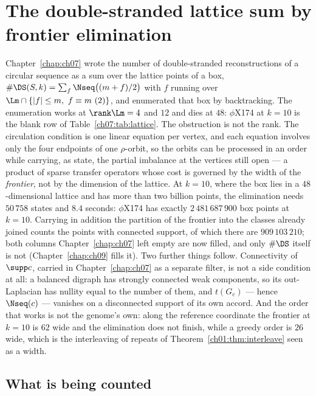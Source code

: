 \chapter[Frontier elimination]{The double-stranded lattice sum by frontier elimination}\label{chap:ch08}
\begin{chaptersummary}
Chapter~\ref{chap:ch07} wrote the number of double-stranded reconstructions of a circular sequence as a sum over
the lattice points of a box, $\#\DS(S,k)=\sum_f\Nseq\big((m+f)/2\big)$ with $f$ running over
$\Lm\cap\{|f|\le m,\ f\equiv m\ (2)\}$, and enumerated that box by backtracking. The
enumeration works at $\rank\Lm=4$ and $12$ and dies at $48$: $\phi$X174 at $k=10$ is the blank
row of Table~\ref{ch07:tab:lattice}. The obstruction is not the rank. The circulation condition is one
linear equation per vertex, and each equation involves only the four endpoints of one
$\rho$-orbit, so the orbits can be processed in an order while carrying, as state, the partial
imbalance at the vertices still open --- a product of sparse transfer operators whose cost is
governed by the width of the \emph{frontier}, not by the dimension of the lattice. At $k=10$,
where the box lies in a $48$-dimensional lattice and has more than two billion points, the
elimination needs $50\,758$ states and $8.4$ seconds: $\phi$X174 has exactly
$2\,481\,687\,900$ box points at $k=10$. Carrying in addition the partition of the frontier
into the classes already joined counts the points with connected support, of which there are
$909\,103\,210$; both columns Chapter~\ref{chap:ch07} left empty are now filled, and only $\#\DS$ itself is not
(Chapter~\ref{chap:ch09} fills it).
Two further things follow. Connectivity of $\supp c$,
carried in Chapter~\ref{chap:ch07} as a separate filter, is not a side condition at all: a balanced digraph has
strongly connected weak components, so its out-Laplacian has nullity equal to the number of
them, and $t(G_c)$ --- hence $\Nseq(c)$ --- vanishes on a disconnected support of its own
accord. And the order that works is not the genome's own: along the reference coordinate the
frontier at $k=10$ is $62$ wide and the elimination does not finish, while a greedy order is
$26$ wide, which is the interleaving of repeats of Theorem~\ref{ch01:thm:interleave} seen as a width.
\end{chaptersummary}

\section{What is being counted}\label{ch08:sec:setup}

